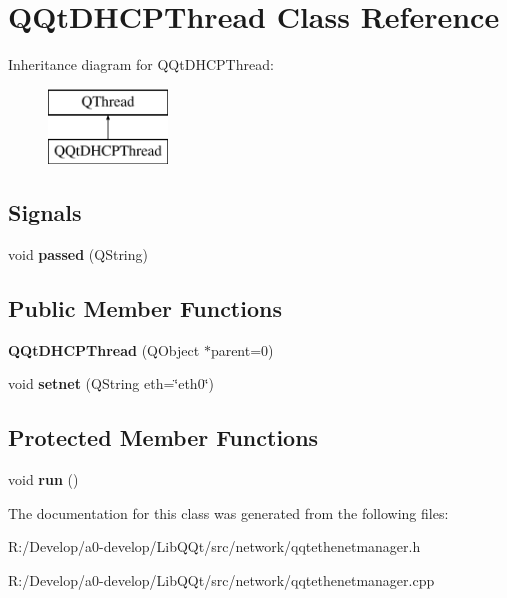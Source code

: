\hypertarget{class_q_qt_d_h_c_p_thread}{}\section{Q\+Qt\+D\+H\+C\+P\+Thread Class Reference}
\label{class_q_qt_d_h_c_p_thread}
Inheritance diagram for Q\+Qt\+D\+H\+C\+P\+Thread\+:\begin{figure}[H]
\begin{center}
\leavevmode
\includegraphics[height=2.000000cm]{class_q_qt_d_h_c_p_thread}
\end{center}
\end{figure}
\subsection*{Signals}
\begin{DoxyCompactItemize}
\item 
\mbox{\label{class_q_qt_d_h_c_p_thread_a6b2717e02bba2d9b7aeda473f36c3ca4}} 
void {\bfseries passed} (Q\+String)
\end{DoxyCompactItemize}
\subsection*{Public Member Functions}
\begin{DoxyCompactItemize}
\item 
\mbox{\label{class_q_qt_d_h_c_p_thread_ac1d0d9b8fbac3ff3e45a921221f0b918}} 
{\bfseries Q\+Qt\+D\+H\+C\+P\+Thread} (Q\+Object $\ast$parent=0)
\item 
\mbox{\label{class_q_qt_d_h_c_p_thread_a0dca79860f2100dc1fb64d4288b733c2}} 
void {\bfseries setnet} (Q\+String eth=\char`\"{}eth0\char`\"{})
\end{DoxyCompactItemize}
\subsection*{Protected Member Functions}
\begin{DoxyCompactItemize}
\item 
\mbox{\label{class_q_qt_d_h_c_p_thread_ac0d040ae5fd9f92466822dda58a673cb}} 
void {\bfseries run} ()
\end{DoxyCompactItemize}


The documentation for this class was generated from the following files\+:\begin{DoxyCompactItemize}
\item 
R\+:/\+Develop/a0-\/develop/\+Lib\+Q\+Qt/src/network/qqtethenetmanager.\+h\item 
R\+:/\+Develop/a0-\/develop/\+Lib\+Q\+Qt/src/network/qqtethenetmanager.\+cpp\end{DoxyCompactItemize}
